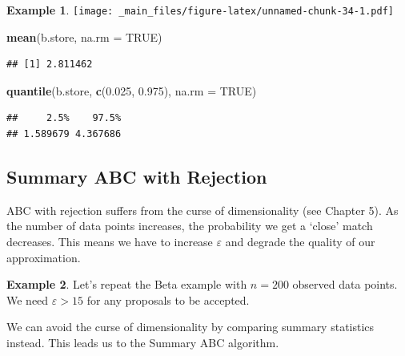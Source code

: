 \documentclass[
]{book}
\newenvironment{Shaded}{\begin{snugshade}}{\end{snugshade}}
\newcommand{\AttributeTok}[1]{\textcolor[rgb]{0.13,0.29,0.53}{#1}}
\newcommand{\ConstantTok}[1]{\textcolor[rgb]{0.56,0.35,0.01}{#1}}
\newcommand{\FloatTok}[1]{\textcolor[rgb]{0.00,0.00,0.81}{#1}}
\newcommand{\FunctionTok}[1]{\textcolor[rgb]{0.13,0.29,0.53}{\textbf{#1}}}
\newcommand{\NormalTok}[1]{#1}
\theoremstyle{definition}
\theoremstyle{definition}
\newtheorem{example}{Example}[chapter]
\theoremstyle{definition}
\theoremstyle{definition}
\theoremstyle{remark}
\begin{document}
\begin{example}
\texttt{[image: \_main\_files/figure-latex/unnamed-chunk-34-1.pdf]}

\begin{Shaded}
\begin{Highlighting}[]
\FunctionTok{mean}\NormalTok{(b.store, }\AttributeTok{na.rm =} \ConstantTok{TRUE}\NormalTok{)}
\end{Highlighting}
\end{Shaded}

\begin{verbatim}
## [1] 2.811462
\end{verbatim}

\begin{Shaded}
\begin{Highlighting}[]
\FunctionTok{quantile}\NormalTok{(b.store, }\FunctionTok{c}\NormalTok{(}\FloatTok{0.025}\NormalTok{, }\FloatTok{0.975}\NormalTok{), }\AttributeTok{na.rm =} \ConstantTok{TRUE}\NormalTok{)}
\end{Highlighting}
\end{Shaded}

\begin{verbatim}
##     2.5%    97.5% 
## 1.589679 4.367686
\end{verbatim}

\end{example}

\hypertarget{summary-abc-with-rejection}{%
\subsection{Summary ABC with Rejection}\label{summary-abc-with-rejection}}

ABC with rejection suffers from the curse of dimensionality (see Chapter 5). As the number of data points increases, the probability we get a `close' match decreases. This means we have to increase \(\varepsilon\) and degrade the quality of our approximation.

\begin{example}
Let's repeat the Beta example with \(n = 200\) observed data points. We need \(\varepsilon > 15\) for any proposals to be accepted.
\end{example}

We can avoid the curse of dimensionality by comparing summary statistics instead. This leads us to the Summary ABC algorithm.
\end{document}
